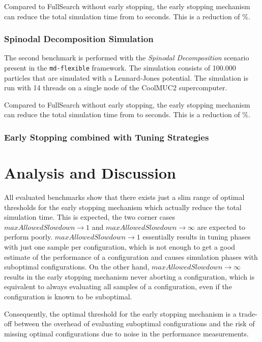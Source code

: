 \documentclass[conference]{IEEEtran}
\begin{document}
Compared to FullSearch without early stopping, the early stopping mechanism can reduce the total simulation time from  to  seconds. This is a reduction of \%.

\subsubsection{Spinodal Decomposition Simulation}

The second benchmark is performed with the \textit{Spinodal Decomposition} scenario present in the \texttt{md-flexible} framework. The simulation consists of 100.000 particles that are simulated with a Lennard-Jones potential. The simulation is run with 14 threads on a single node of the CoolMUC2 supercomputer.




Compared to FullSearch without early stopping, the early stopping mechanism can reduce the total simulation time from  to  seconds. This is a reduction of \%.


\subsubsection{Early Stopping combined with Tuning Strategies}



\section{Analysis and Discussion}

All evaluated benchmarks show that there exists just a slim range of optimal thresholds for the early stopping mechanism which actually reduce the total simulation time. This is expected, the two corner cases $maxAllowedSlowdown \to 1$ and $maxAllowedSlowdown \to \infty$ are expected to perform poorly. $maxAllowedSlowdown \to 1$ essentially results in tuning phases with just one sample per configuration, which is not enough to get a good estimate of the performance of a configuration and causes simulation phases with suboptimal configurations. On the other hand, $maxAllowedSlowdown \to \infty$ results in the early stopping mechanism never aborting a configuration, which is equivalent to always evaluating all samples of a configuration, even if the configuration is known to be suboptimal.

Consequently, the optimal threshold for the early stopping mechanism is a trade-off between the overhead of evaluating suboptimal configurations and the risk of missing optimal configurations due to noise in the performance measurements.
\end{document}
